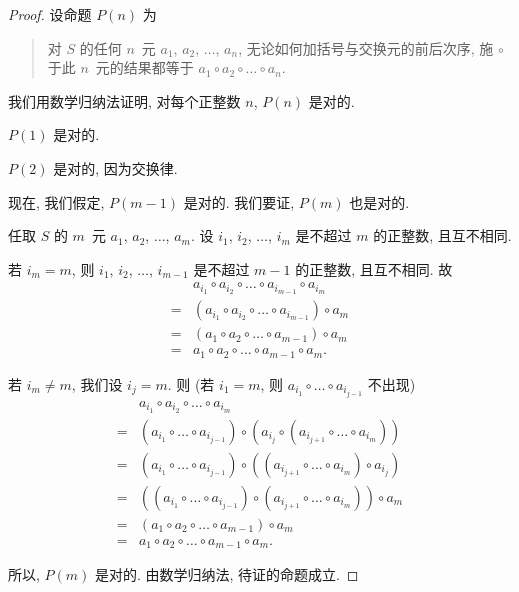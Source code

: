 \documentclass[../libro.tex]{subfiles}
\begin{document}
\begin{proof}
    设命题 \(P(n)\) 为
    \begin{quotation}
        对 \(S\) 的任何 \(n\)~元
        \(a_1\), \(a_2\), \(\dots\), \(a_n\),
        无论如何加括号与交换元的前后次序,
        施 \(\circ\) 于此 \(n\)~元的结果都等于
        \(a_1 \circ a_2 \circ \dots \circ a_n\).
    \end{quotation}
    我们用数学归纳法证明,
    对每个正整数 \(n\), \(P(n)\) 是对的.

    \(P(1)\) 是对的.

    \(P(2)\) 是对的, 因为交换律.

    现在, 我们假定, \(P(m-1)\) 是对的.
    我们要证, \(P(m)\) 也是对的.

    任取 \(S\) 的 \(m\)~元
    \(a_1\), \(a_2\), \(\dots\), \(a_m\).
    设 \(i_1\), \(i_2\), \(\dots\), \(i_m\)
    是不超过 \(m\) 的正整数,
    且互不相同.

    若 \(i_m = m\),
    则 \(i_1\), \(i_2\), \(\dots\), \(i_{m-1}\)
    是不超过 \(m-1\) 的正整数,
    且互不相同.
    故
    \begin{align*}
        & a_{i_1} \circ a_{i_2} \circ
        \dots \circ a_{i_{m-1}} \circ a_{i_m}               \\
        = {} &
        (a_{i_1} \circ a_{i_2} \circ
        \dots \circ a_{i_{m-1}}) \circ a_m                  \\
        = {} &
        (a_1 \circ a_2 \circ \dots \circ a_{m-1}) \circ a_m \\
        = {} &
        a_1 \circ a_2 \circ \dots \circ a_{m-1} \circ a_m.
    \end{align*}

    若 \(i_m \neq m\),
    我们设 \(i_j = m\).
    则
    (若 \(i_1 = m\),
    则 \(a_{i_1} \circ \dots \circ a_{i_{j-1}}\) 不出现)
    \begin{align*}
        & a_{i_1} \circ a_{i_2} \circ
        \dots \circ a_{i_m}                                 \\
        = {} & (a_{i_1} \circ \dots \circ a_{i_{j-1}})
        \circ (a_{i_j}
        \circ (a_{i_{j+1}} \circ \dots \circ a_{i_m}))      \\
        = {} & (a_{i_1} \circ \dots \circ a_{i_{j-1}})
        \circ ((a_{i_{j+1}} \circ \dots \circ a_{i_m})
        \circ a_{i_j})                                      \\
        = {} & ((a_{i_1} \circ \dots \circ a_{i_{j-1}})
        \circ (a_{i_{j+1}} \circ \dots \circ a_{i_m}))
        \circ a_m                                           \\
        = {} &
        (a_1 \circ a_2 \circ \dots \circ a_{m-1}) \circ a_m \\
        = {} &
        a_1 \circ a_2 \circ \dots \circ a_{m-1} \circ a_m.
    \end{align*}

    所以, \(P(m)\) 是对的.
    由数学归纳法, 待证的命题成立.
\end{proof}
\end{document}
